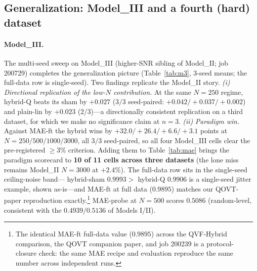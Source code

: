 \documentclass[10pt,letterpaper]{article}
\theoremstyle{plain}
\theoremstyle{definition}
\begin{document}
\subsection{Generalization: Model\_III and a fourth (hard) dataset}
\label{sec:generalization}

\paragraph{Model\_III.}
The multi-seed sweep on Model\_III (higher-SNR sibling of Model\_II; job 200729)
completes the generalization picture (Table~\ref{tab:m3}, $3$-seed means; the
full-data row is single-seed). Two findings replicate the Model\_II story.
\emph{(i) Directional replication of the low-$N$ contribution.} At the same
$N{=}250$ regime, hybrid-Q beats its sham by $+0.027$ ($3/3$ seed-paired:
$+0.042/+0.037/+0.002$) and plain-lin by $+0.023$ ($2/3$)---a directionally
consistent replication on a third dataset, for which we make no significance
claim at $n{=}3$.
\emph{(ii) Paradigm win.} Against MAE-ft the hybrid wins by
$+32.0/+26.4/+6.6/+3.1$ points at $N{=}250/500/1000/3000$, all $3/3$ seed-paired,
so all four Model\_III cells clear the pre-registered $\geq 3\%$ criterion. Adding
them to Table~\ref{tab:mae} brings the paradigm scorecard to \textbf{10 of 11
cells across three datasets} (the lone miss remains Model\_II $N{=}3000$ at
$+2.4\%$). The full-data row sits in the single-seed ceiling-noise band---%
hybrid-sham $0.9993 >$ hybrid-Q $0.9906$ is a single-seed jitter example, shown
as-is---and MAE-ft at full data ($0.9895$) matches our QOVT-paper reproduction
exactly.\footnote{The identical MAE-ft full-data value ($0.9895$) across the
QVF-Hybrid comparison, the QOVT companion paper, and job 200239 is a
protocol-closure check: the same MAE recipe and evaluation reproduce the same
number across independent runs.} MAE-probe at $N{=}500$ scores $0.5086$
(random-level, consistent with the $0.4939/0.5136$ of Models I/II).
\end{document}
